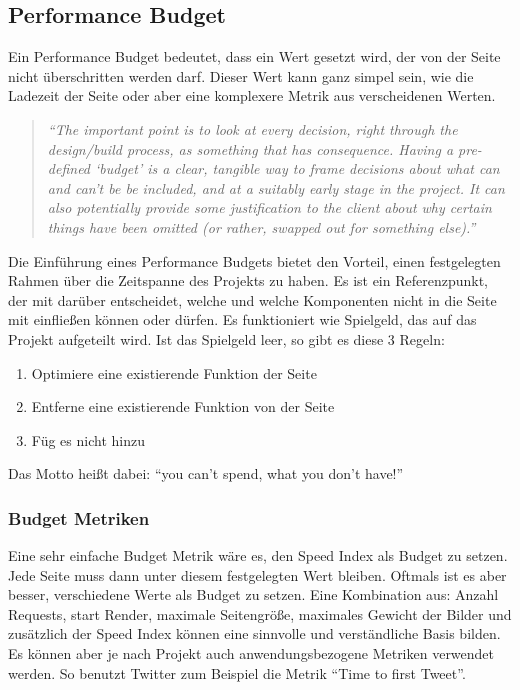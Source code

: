 	



		\subsection{Performance Budget} %
		\label{sub:performance_budget}
			Ein Performance Budget bedeutet, dass ein Wert gesetzt wird, der von der Seite nicht überschritten werden darf. Dieser Wert kann ganz simpel sein, wie die Ladezeit der Seite oder aber eine komplexere Metrik aus verscheidenen Werten.

			\begin{quote}
				\textit{"`The important point is to look at every decision, right through the design/build process, as something that has consequence. Having a pre-defined ‘budget’ is a clear, tangible way to frame decisions about what can and can’t be be included, and at a suitably early stage in the project. It can also potentially provide some justification to the client about why certain things have been omitted (or rather, swapped out for something else)."'}
			\end{quote}

			Die Einführung eines Performance Budgets bietet den Vorteil, einen festgelegten Rahmen über die Zeitspanne des Projekts zu haben. Es ist ein Referenzpunkt, der mit darüber entscheidet, welche und welche Komponenten nicht in die Seite mit einfließen können oder dürfen. Es funktioniert wie Spielgeld, das auf das Projekt aufgeteilt wird. Ist das Spielgeld leer, so gibt es diese 3 Regeln:
			\begin{enumerate}
				\item Optimiere eine existierende Funktion der Seite
				\item Entferne eine existierende Funktion von der Seite
				\item Füg es nicht hinzu
			\end{enumerate}
			Das Motto heißt dabei: "`you can't spend, what you don't have!"'

			\subsubsection{Budget Metriken} %
			\label{ssub:Budget_metriken}
				
				Eine sehr einfache Budget Metrik wäre es, den Speed Index als Budget zu setzen. Jede Seite muss dann unter diesem festgelegten Wert bleiben. Oftmals ist es aber besser, verschiedene Werte als Budget zu setzen. Eine Kombination aus: Anzahl Requests, start Render, maximale Seitengröße, maximales Gewicht der Bilder und zusätzlich der Speed Index können eine sinnvolle und verständliche Basis bilden. Es können aber je nach Projekt auch anwendungsbezogene Metriken verwendet werden. So benutzt Twitter zum Beispiel die Metrik "`Time to first Tweet"'.

